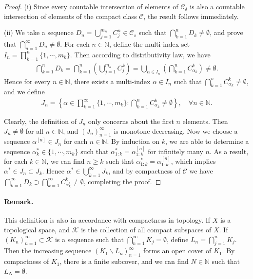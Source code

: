 \documentclass{article}
\numberwithin{equation}{section}
\theoremstyle{plain}
\theoremstyle{definition}
\begin{document}
\begin{proof}
(i) Since every countable intersection of elements of $\mathscr{C}_\delta$ is also a countable intersection of elements of the compact class $\mathscr{C}$, the result follows immediately.

(ii) We take a sequence $D_n=\bigcup_{j=1}^{m_n}C_j^n\in\mathscr{C}_s$ such that $\bigcap_{k=1}^n D_k\neq\emptyset$, and prove that $\bigcap_{n=1}^\infty D_n\neq\emptyset$. For each $n\in\mathbb{N}$, define the multi-index set $I_n=\prod_{k=1}^n\{1,\cdots,m_k\}$. Then according to distributivity law, we have
\begin{align*}
	\bigcap_{k=1}^n D_k = \bigcap_{k=1}^n\left(\bigcup_{j=1}^{m_k}C_j^k\right) = \bigcup_{\alpha\in I_n}\left(\bigcap_{k=1}^n C_{\alpha_k}^k\right)\neq\emptyset.
\end{align*}
Hence for every $n\in\mathbb{N}$, there exists a multi-index $\alpha\in I_n$ such that $\bigcap_{k=1}^nC_{\alpha_k}^k\neq\emptyset$, and we define
\begin{align*}
	J_n=\left\{\alpha\in\prod_{k=1}^\infty\{1,\cdots,m_k\}:\bigcap_{k=1}^nC_{\alpha_k}^k\neq\emptyset\right\},\quad \forall n\in\mathbb{N}.
\end{align*}

Clearly, the definition of $J_n$ only concerns about the first $n$ elements. Then $J_n\neq\emptyset$ for all $n\in\mathbb{N}$, and $(J_n)_{n=1}^\infty$ is monotone decreasing. Now we choose a sequence $\alpha^{[n]}\in J_n$ for each $n\in\mathbb{N}$. By induction on $k$, we are able to determine a sequence $\alpha_k^*\in\{1,\cdots,m_k\}$ such that $\alpha_{1:k}^*=\alpha_{1:k}^{[n]}$ for infinitely many $n$. As a result, for each $k\in\mathbb{N}$, we can find $n\geq k$ such that $\alpha_{1:k}^*=\alpha_{1:k}^{[n]}$, which implies $\alpha^*\in J_n\subset J_k$. Hence $\alpha^*\in\bigcup_{k=1}^\infty J_k$, and by compactness of $\mathscr{C}$ we have $\bigcap_{k=1}^\infty D_k\supset \bigcap_{k=1}^\infty C_{\alpha_k^*}^k\neq\emptyset$, completing the proof.
\end{proof}

\paragraph{Remark.} This definition is also in accordance with compactness in topology. If $X$ is a topological space, and $\mathscr{K}$ is the collection of all compact subspaces of $X$. If $(K_n)_{n=1}^\infty\subset\mathscr{K}$ is a sequence such that $\bigcap_{n=1}^\infty K_j=\emptyset$, define $L_n=\bigcap_{j=1}^n K_j$. Then the increasing sequence $(K_1\backslash L_n)_{n=1}^\infty$ forms an open cover of $K_1$. By compactness of $K_1$, there is a finite subcover, and we can find $N\in\mathbb{N}$ such that $L_N=\emptyset$.
\end{document}
